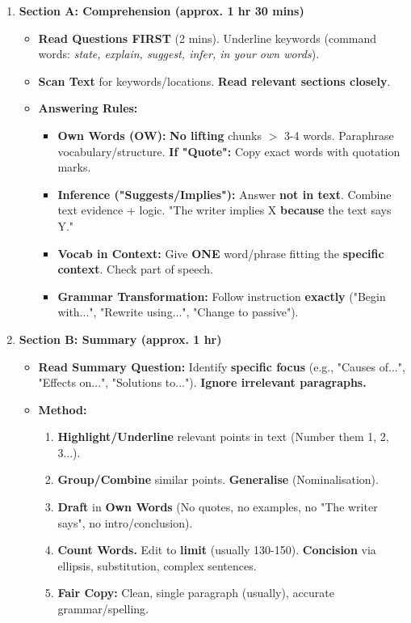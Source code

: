 \documentclass[11pt]{article}
\begin{document}
\begin{methode}
\begin{enumerate}
    \item \textbf{Section A: Comprehension (approx. 1 hr 30 mins)}
    \begin{itemize}
        \item \textbf{Read Questions FIRST} (2 mins). Underline keywords (command words: \textit{state, explain, suggest, infer, in your own words}).
        \item \textbf{Scan Text} for keywords/locations. \textbf{Read relevant sections closely}.
        \item \textbf{Answering Rules:}
        \begin{itemize}
            \item \textbf{Own Words (OW):} \textbf{No lifting} chunks $>$ 3-4 words. Paraphrase vocabulary/structure. \textbf{If "Quote":} Copy exact words with quotation marks.
            \item \textbf{Inference ("Suggests/Implies"):} Answer \textbf{not in text}. Combine text evidence + logic. "The writer implies X \textbf{because} the text says Y."
            \item \textbf{Vocab in Context:} Give \textbf{ONE} word/phrase fitting the \textbf{specific context}. Check part of speech.
            \item \textbf{Grammar Transformation:} Follow instruction \textbf{exactly} ("Begin with...", "Rewrite using...", "Change to passive").
        \end{itemize}
    \end{itemize}
    \item \textbf{Section B: Summary (approx. 1 hr)}
    \begin{itemize}
        \item \textbf{Read Summary Question:} Identify \textbf{specific focus} (e.g., "Causes of...", "Effects on...", "Solutions to..."). \textbf{Ignore irrelevant paragraphs.}
        \item \textbf{Method:}
        \begin{enumerate}
            \item \textbf{Highlight/Underline} relevant points in text (Number them 1, 2, 3...).
            \item \textbf{Group/Combine} similar points. \textbf{Generalise} (Nominalisation).
            \item \textbf{Draft} in \textbf{Own Words} (No quotes, no examples, no "The writer says", no intro/conclusion).
            \item \textbf{Count Words.} Edit to \textbf{limit} (usually 130-150). \textbf{Concision} via ellipsis, substitution, complex sentences.
            \item \textbf{Fair Copy:} Clean, single paragraph (usually), accurate grammar/spelling.
        \end{enumerate}
    \end{itemize}
\end{enumerate}
\end{methode}
\end{document}
